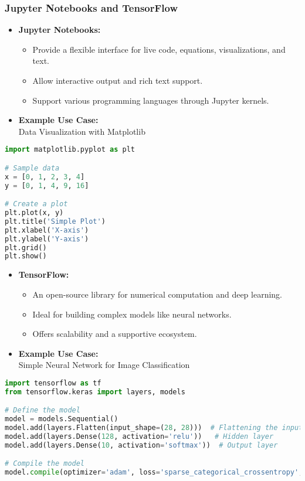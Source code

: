 \documentclass[aspectratio=169]{beamer}
\begin{document}
\begin{frame}[fragile]
    \frametitle{Jupyter Notebooks and TensorFlow}
    \begin{itemize}
        \item \textbf{Jupyter Notebooks:}
        \begin{itemize}
            \item Provide a flexible interface for live code, equations, visualizations, and text.
            \item Allow interactive output and rich text support.
            \item Support various programming languages through Jupyter kernels.
        \end{itemize}

        \item \textbf{Example Use Case:} \\
        Data Visualization with Matplotlib
    \end{itemize}
    
    \begin{lstlisting}[language=Python]
import matplotlib.pyplot as plt

# Sample data
x = [0, 1, 2, 3, 4]
y = [0, 1, 4, 9, 16]

# Create a plot
plt.plot(x, y)
plt.title('Simple Plot')
plt.xlabel('X-axis')
plt.ylabel('Y-axis')
plt.grid()
plt.show()
    \end{lstlisting}
    
    \begin{itemize}
        \item \textbf{TensorFlow:}
        \begin{itemize}
            \item An open-source library for numerical computation and deep learning.
            \item Ideal for building complex models like neural networks.
            \item Offers scalability and a supportive ecosystem.
        \end{itemize}
        
        \item \textbf{Example Use Case:} \\
        Simple Neural Network for Image Classification
    \end{itemize}
    
    \begin{lstlisting}[language=Python]
import tensorflow as tf
from tensorflow.keras import layers, models

# Define the model
model = models.Sequential()
model.add(layers.Flatten(input_shape=(28, 28)))  # Flattening the input
model.add(layers.Dense(128, activation='relu'))   # Hidden layer
model.add(layers.Dense(10, activation='softmax'))  # Output layer

# Compile the model
model.compile(optimizer='adam', loss='sparse_categorical_crossentropy', metrics=['accuracy'])
    \end{lstlisting}
\end{frame}
\end{document}
